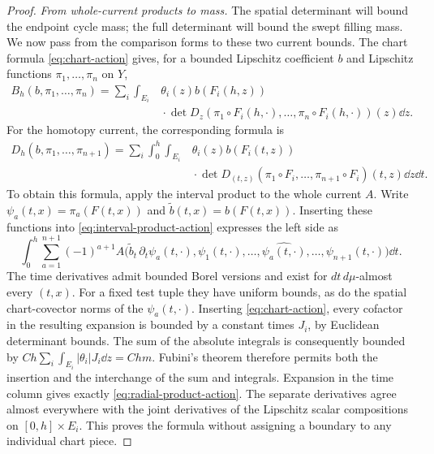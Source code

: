 \begin{proof}
\emph{From whole-current products to mass.}
The spatial determinant will bound the endpoint cycle mass; the full
determinant will bound the swept filling mass. We now pass from the
comparison forms to these two current bounds. The chart formula
\eqref{eq:chart-action} gives, for a bounded Lipschitz coefficient $b$
and Lipschitz functions
$\pi_1,\ldots,\pi_n$ on $Y$,
\begin{equation}
 \begin{split}
 B_h(b,\pi_1,\ldots,\pi_n)
 =\sum_i\int_{E_i}&\theta_i(z)b(F_i(h,z))\\[-2pt]
       &{}\cdot\det D_z(\pi_1\circ F_i(h,\cdot),\ldots,
                 \pi_n\circ F_i(h,\cdot))(z)\dd z.
 \end{split}
 \label{eq:radial-pushforward-action}
\end{equation}
For the homotopy current, the corresponding formula is
\begin{equation}
 \begin{split}
 D_h(b,\pi_1,\ldots,\pi_{n+1})
 =\sum_i\int_0^h\int_{E_i}
       &\theta_i(z)b(F_i(t,z))\\[-2pt]
       &{}\cdot\det D_{(t,z)}
          (\pi_1\circ F_i,\ldots,\pi_{n+1}\circ F_i)(t,z)
          \dd z\dd t.
 \end{split}
 \label{eq:radial-product-action}
\end{equation}
To obtain this formula, apply the interval product to the whole
current $A$. Write $\psi_a(t,x)=\pi_a(F(t,x))$ and
$\widetilde b(t,x)=b(F(t,x))$.  Inserting these functions into
\eqref{eq:interval-product-action} expresses the left side as
\[
 \int_0^h\sum_{a=1}^{n+1}(-1)^{a+1}
 A\bigl(\widetilde b_t\,\partial_t\psi_a(t,\cdot),
   \psi_1(t,\cdot),\ldots,\widehat{\psi_a(t,\cdot)},\ldots,
   \psi_{n+1}(t,\cdot)\bigr)\dd t.
\]
The time derivatives admit bounded Borel versions and exist for
$dt\,d\mu$-almost every $(t,x)$.  For a fixed test tuple they have
uniform bounds, as do the spatial chart-covector norms of the
$\psi_a(t,\cdot)$.  Inserting \eqref{eq:chart-action}, every
cofactor in the resulting expansion is bounded by a constant
times $J_i$, by Euclidean determinant bounds.  The sum of the
absolute integrals is consequently bounded by
$C h\sum_i\int_{E_i}|\theta_i|J_i\dd z=C h m$.
Fubini's theorem therefore permits both the insertion and the
interchange of the sum and integrals.  Expansion in the time
column gives exactly \eqref{eq:radial-product-action}.
The separate derivatives agree almost everywhere with the joint
derivatives of the Lipschitz scalar compositions on
$[0,h]\times E_i$.  This proves the formula without assigning a
boundary to any individual chart piece.


\end{proof}
